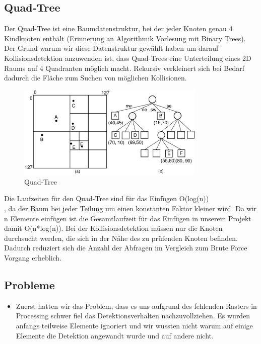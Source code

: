 \documentclass[12pt,a4paper]{article}
\begin{document}
	\subsection{Quad-Tree}
	Der Quad-Tree ist eine Baumdatenstruktur, bei der jeder Knoten genau 4 Kindknoten enthält (Erinnerung an Algorithmik Vorlesung mit Binary Trees). Der Grund warum wir diese Datenstruktur gewählt haben um darauf Kollisionsdetektion anzuwenden ist, dass Quad-Trees eine Unterteilung eines 2D Raums auf 4 Quadranten möglich macht. Rekursiv verkleinert sich bei Bedarf dadurch die Fläche zum Suchen von möglichen Kollisionen.
	\begin{figure}[H]
		\centering 
		\includegraphics[width=0.8\textwidth]{quadtree.png}  
		\caption{Quad-Tree  \cite{quadtree_example}} 
		\label{Bild: Beispiel Quadtree}  
	\end{figure}
	Die Laufzeiten für den Quad-Tree sind für das Einfügen O(log(n)) \cite{quadtree_source}~ \\, da der Baum bei jeder Teilung um einen konstanten Faktor kleiner wird. Da wir n Elemente einfügen ist die Gesamtlaufzeit für das Einfügen in unserem Projekt damit O(n*log(n)). 
	Bei der Kollisionsdetektion müssen nur die Knoten durchsucht werden, die sich in der Nähe des zu prüfenden Knoten befinden. Dadurch reduziert sich die Anzahl der Abfragen im Vergleich zum Brute Force Vorgang erheblich.
	\subsection{Probleme}
	\begin{itemize}
		\item
		Zuerst hatten wir das Problem, dass es uns aufgrund des fehlenden Rasters in Processing schwer fiel das Detektionsverhalten nachzuvollziehen. Es wurden anfangs teilweise Elemente ignoriert und wir wussten nicht warum auf einige Elemente die Detektion angewandt wurde und auf andere nicht.
	\end{itemize}
\end{document}
